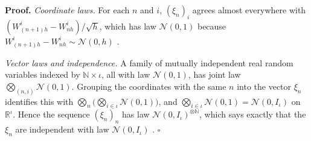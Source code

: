 \documentclass[11pt,a4paper]{article}
\begin{document}
\textbf{Proof.} \emph{Coordinate laws.} For each \(n\) and \(i\), \((\xi_n)_i\) agrees almost everywhere with \((W^i_{(n+1)h}-W^i_{nh})/\sqrt h\), which has law \(\mathcal N(0,1)\) because \(W^i_{(n+1)h}-W^i_{nh}\sim\mathcal N(0,h)\) \cite[Section~3.32.10]{LangevinLean2026ULASC}.




\emph{Vector laws and independence.} A family of mutually independent real random variables indexed by \(\mathbb N\times\iota\), all with law \(\mathcal N(0,1)\), has joint law \(\bigotimes_{(n,i)}\mathcal N(0,1)\). Grouping the coordinates with the same \(n\) into the vector \(\xi_n\) identifies this with \(\bigotimes_n\bigl(\bigotimes_{i\in\iota}\mathcal N(0,1)\bigr)\), and \(\bigotimes_{i\in\iota}\mathcal N(0,1)=\mathcal N(0,I_\iota)\) on \(\mathbb R^\iota\). Hence the sequence \((\xi_n)_n\) has law \(\mathcal N(0,I_\iota)^{\otimes\mathbb N}\), which says exactly that the \(\xi_n\) are independent with law \(\mathcal N(0,I_\iota)\) \cite[Section~3.41.3]{LangevinLean2026ULASC}. \(\square\)
\end{document}

